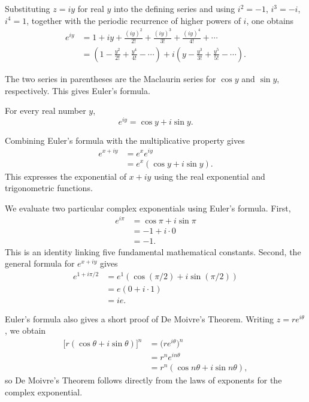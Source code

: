 Substituting $z = iy$ for real $y$ into the defining series and using $i^2 = -1$, $i^3 = -i$, $i^4 = 1$, together with the periodic recurrence of higher powers of $i$, one obtains
\[
\begin{aligned}
e^{iy} &= 1 + iy + \frac{(iy)^2}{2!} + \frac{(iy)^3}{3!} + \frac{(iy)^4}{4!} + \cdots \\
&= \left(1 - \frac{y^2}{2!} + \frac{y^4}{4!} - \cdots\right) + i \left( y - \frac{y^3}{3!} + \frac{y^5}{5!} - \cdots \right).
\end{aligned}
\]

The two series in parentheses are the Maclaurin series for $\cos y$ and $\sin y$, respectively. This gives Euler's formula.

\begin{theorem}
For every real number $y$,
\[
e^{iy} = \cos y + i \sin y.
\]

\end{theorem}

Combining Euler's formula with the multiplicative property gives
\[
\begin{aligned}
e^{x+iy} &= e^x e^{iy} \\
&= e^x (\cos y + i \sin y).
\end{aligned}
\]
This expresses the exponential of $x+iy$ using the real exponential and trigonometric functions.

\begin{example}
We evaluate two particular complex exponentials using Euler's formula. First,
\[
\begin{aligned}
e^{i\pi} &= \cos\pi + i \sin\pi \\
&= -1 + i \cdot 0 \\
&= -1.
\end{aligned}
\]
This is an identity linking five fundamental mathematical constants. Second, the general formula for $e^{x+iy}$ gives
\[
\begin{aligned}
e^{1+i\pi/2} &= e^1 (\cos(\pi/2) + i \sin(\pi/2)) \\
&= e(0 + i \cdot 1) \\
&= ie.
\end{aligned}
\]

\end{example}

\enlargethispage{3\baselineskip}
Euler's formula also gives a short proof of De Moivre's Theorem. Writing $z = re^{i\theta}$, we obtain
\[
\begin{aligned}
\big[ r(\cos\theta + i\sin\theta) \big]^n &= \big( r e^{i\theta} \big)^n \\
&= r^n e^{in\theta} \\
&= r^n (\cos n\theta + i \sin n\theta),
\end{aligned}
\]
so De Moivre's Theorem follows directly from the laws of exponents for the complex exponential.
